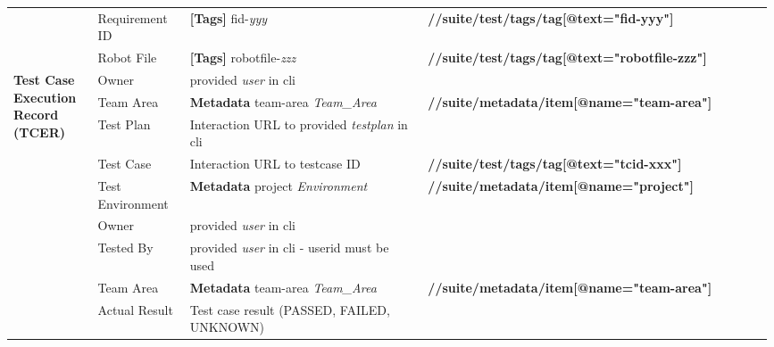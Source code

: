 \begin{table}[h]
\begin{tabular}{|p{0.11\linewidth}|p{0.12\linewidth}|p{0.31\linewidth}|p{0.45\linewidth}|}
                        &Requirement ID 
                                      &\textbf{[Tags]} fid-\emph{yyy}  
                                                    &\textbf{//suite/test/tags/tag[@text="fid-yyy"]}\\
                        \cline{2-4}
                        &Robot File   &\textbf{[Tags]} robotfile-\emph{zzz}   
                                                    &\textbf{//suite/test/tags/tag[@text="robotfile-zzz"]}\\
      \hline
      \multirow{8}{\linewidth}{\textbf{Test Case Execution Record (TCER)}}
                        &Owner        &provided \emph{user} in cli  
                                                    &\\
                        \cline{2-4}
                        &Team Area    &\textbf{Metadata} team-area \emph{Team\_Area} 
                                                    &\textbf{//suite/metadata/item[@name="team-area"]}\\
                        \cline{2-4}
                        &Test Plan    &Interaction URL to provided \emph{testplan} in cli
                                                    &\\
                        \cline{2-4}
                        &Test Case    &Interaction URL to testcase ID
                                                    &\textbf{//suite/test/tags/tag[@text="tcid-xxx"]}\\
                        \cline{2-4}
                        &Test Environment  
                                      &\textbf{Metadata} project \emph{Environment} 
                                                    &\textbf{//suite/metadata/item[@name="project"]}\\
      \hline
      \multirow{13}{\linewidth}{\textbf{Test Result }}
                        &Owner        &provided \emph{user} in cli  
                                                    &\\
                        \cline{2-4}
                        &Tested By    &provided \emph{user} in cli - userid must be used
                                                    &\\
                        \cline{2-4}
                        &Team Area    &\textbf{Metadata} team-area \emph{Team\_Area}
                                                    &\textbf{//suite/metadata/item[@name="team-area"]}\\
                        \cline{2-4}
                        &Actual Result&Test case result (PASSED, FAILED, UNKNOWN)

\end{tabular}
\end{table}
